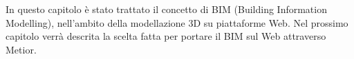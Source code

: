 In questo capitolo è stato trattato il concetto di BIM (Building Information Modelling),
nell'ambito della modellazione 3D su piattaforme Web. Nel prossimo
capitolo verrà descrita la scelta fatta per portare il BIM sul Web attraverso Metior.
